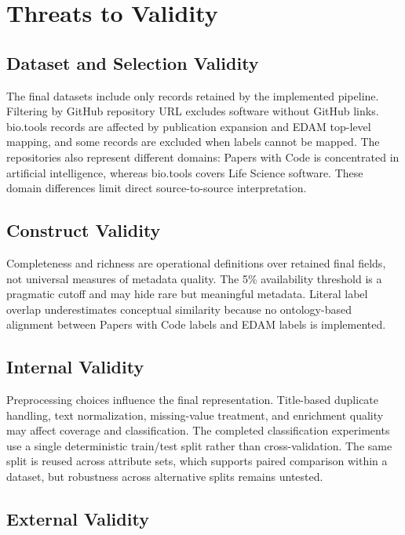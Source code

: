 \documentclass[pdflatex,sn-mathphys-num]{sn-jnl}%
\theoremstyle{thmstyleone}%
\theoremstyle{thmstyletwo}%
\theoremstyle{thmstylethree}%
\begin{document}
\section{Threats to Validity}
\label{sec:threats}

\subsection{Dataset and Selection Validity}
\label{subsec:threats-dataset}

The final datasets include only records retained by the implemented pipeline. Filtering by GitHub repository URL excludes software without GitHub links. bio.tools records are affected by publication expansion and EDAM top-level mapping, and some records are excluded when labels cannot be mapped. The repositories also represent different domains: Papers with Code is concentrated in artificial intelligence, whereas bio.tools covers Life Science software. These domain differences limit direct source-to-source interpretation.

\subsection{Construct Validity}
\label{subsec:threats-construct}

Completeness and richness are operational definitions over retained final fields, not universal measures of metadata quality. The 5\% availability threshold is a pragmatic cutoff and may hide rare but meaningful metadata. Literal label overlap underestimates conceptual similarity because no ontology-based alignment between Papers with Code labels and EDAM labels is implemented.

\subsection{Internal Validity}
\label{subsec:threats-internal}

Preprocessing choices influence the final representation. Title-based duplicate handling, text normalization, missing-value treatment, and enrichment quality may affect coverage and classification. The completed classification experiments use a single deterministic train/test split rather than cross-validation. The same split is reused across attribute sets, which supports paired comparison within a dataset, but robustness across alternative splits remains untested.

\subsection{External Validity}
\label{subsec:threats-external}
\end{document}
